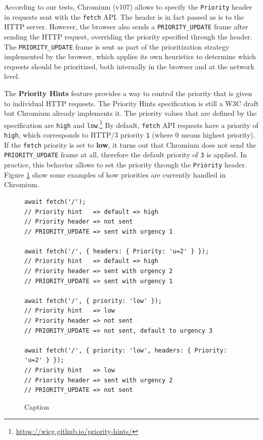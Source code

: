 According to our tests, Chromium (v107) allows to specify the \texttt{Priority} header in requests sent with the \texttt{fetch} API. The header is in fact passed as is to the HTTP server. However, the browser also sends a \texttt{PRIORITY\_UPDATE} frame after sending the HTTP request, overriding the priority specified through the header. The \texttt{PRIORITY\_UPDATE} frame is sent as part of the prioritization strategy implemented by the browser, which applies its own heuristics to determine which requests should be prioritized, both internally in the browser and at the network level.

The \textbf{Priority Hints} feature provides a way to control the priority that is given to individual HTTP requests. The Priority Hints specification is still a W3C draft but Chromium already implements it. The priority values that are defined by the specification are \texttt{high} and \texttt{low}.\footnote{\url{https://wicg.github.io/priority-hints/}} By default, \texttt{fetch} API requests have a priority of \texttt{high}, which corresponds to HTTP/3 priority \texttt{1} (where 0 means highest priority). If the \texttt{fetch} priority is set to \textbf{low}, it turns out that Chromium does not send the \texttt{PRIORITY\_UPDATE} frame at all, therefore the default priority of \texttt{3} is applied. In practice, this behavior allows to set the priority through the \texttt{Priority} header. Figure \ref{fig:chromium_fetch} show some examples of how priorities are currently handled in Chromium.

\begin{figure}
    \centering
    \begin{verbatim}
await fetch('/');
// Priority hint   => default => high
// Priority header => not sent
// PRIORITY_UPDATE => sent with urgency 1

await fetch('/', { headers: { Priority: 'u=2' } });
// Priority hint   => default => high
// Priority header => sent with urgency 2
// PRIORITY_UPDATE => sent with urgency 1

await fetch('/', { priority: 'low' });
// Priority hint   => low
// Priority header => not sent
// PRIORITY_UPDATE => not sent, default to urgency 3

await fetch('/', { priority: 'low', headers: { Priority: 'u=2' } });
// Priority hint   => low
// Priority header => sent with urgency 2
// PRIORITY_UPDATE => not sent
    \end{verbatim}
    \caption{Caption}
    \label{fig:chromium_fetch}
\end{figure}

